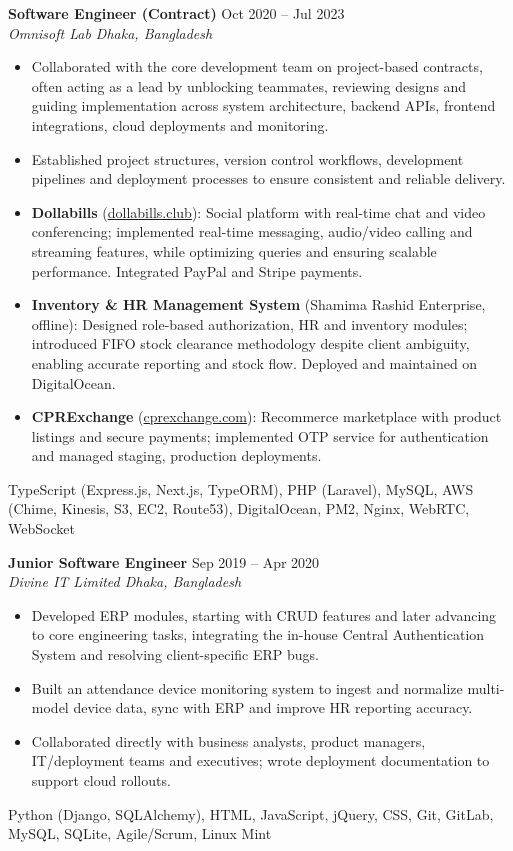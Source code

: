 \documentclass[a4paper,10pt]{article}
\begin{document}
\textbf{Software Engineer (Contract)} \hfill Oct 2020 -- Jul 2023\\[-2pt]
\textit{Omnisoft Lab \textbar{} Dhaka, Bangladesh}\\[-4pt]
\begin{itemize}
  \item Collaborated with the core development team on project-based contracts, often acting as a lead by unblocking teammates, reviewing designs and guiding implementation across system architecture, backend APIs, frontend integrations, cloud deployments and monitoring.
  \item Established project structures, version control workflows, development pipelines and deployment processes to ensure consistent and reliable delivery.
  \item \textbf{Dollabills} (\href{https://dollabills.club}{dollabills.club}): Social platform with real-time chat and video conferencing; implemented real-time messaging, audio/video calling and streaming features, while optimizing queries and ensuring scalable performance. Integrated PayPal and Stripe payments.
  \item \textbf{Inventory \& HR Management System} (Shamima Rashid Enterprise, offline): Designed role-based authorization, HR and inventory modules; introduced FIFO stock clearance methodology despite client ambiguity, enabling accurate reporting and stock flow. Deployed and maintained on DigitalOcean.
  \item \textbf{CPRExchange} (\href{https://cprexchange.com}{cprexchange.com}): Recommerce marketplace with product listings and secure payments; implemented OTP service for authentication and managed staging, production deployments.
\end{itemize}
{\footnotesize\textsf{TypeScript (Express.js, Next.js, TypeORM), PHP (Laravel), MySQL, AWS (Chime, Kinesis, S3, EC2, Route53), DigitalOcean, PM2, Nginx, WebRTC, WebSocket}}

\vspace{2pt}

\textbf{Junior Software Engineer} \hfill Sep 2019 -- Apr 2020\\[-2pt]
\textit{Divine IT Limited \textbar{} Dhaka, Bangladesh}\\[-4pt]
\begin{itemize}
  \item Developed ERP modules, starting with CRUD features and later advancing to core engineering tasks, integrating the in-house Central Authentication System and resolving client-specific ERP bugs.
  \item Built an attendance device monitoring system to ingest and normalize multi-model device data, sync with ERP and improve HR reporting accuracy.
  \item Collaborated directly with business analysts, product managers, IT/deployment teams and executives; wrote deployment documentation to support cloud rollouts.
\end{itemize}
{\footnotesize\textsf{Python (Django, SQLAlchemy), HTML, JavaScript, jQuery, CSS, Git, GitLab, MySQL, SQLite, Agile/Scrum, Linux Mint}}
\end{document}
